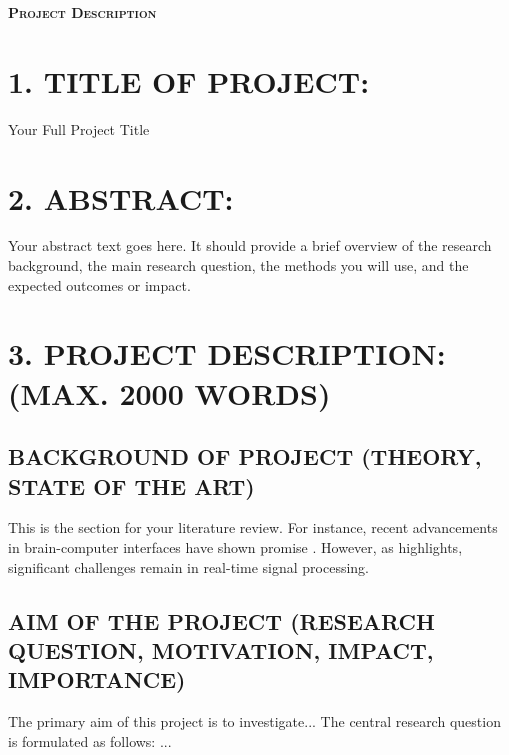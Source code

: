\documentclass[12pt, a4paper]{article}
\begin{document}
\begin{center}
    \fontsize{14}{18}\bfseries
    \textsc{Project Description}
    \vspace{2em}
\end{center}


\section*{1. TITLE OF PROJECT:}
Your Full Project Title

\section*{2. ABSTRACT:}
\justifying
Your abstract text goes here. It should provide a brief overview of the research background, the main research question, the methods you will use, and the expected outcomes or impact.

\section*{3. PROJECT DESCRIPTION: (MAX. 2000 WORDS)}

\subsection*{BACKGROUND OF PROJECT (THEORY, STATE OF THE ART)}
\justifying
This is the section for your literature review. For instance, recent advancements in brain-computer interfaces have shown promise \parencite{Author2023}. However, as \textcite{Researcher2022} highlights, significant challenges remain in real-time signal processing.

\subsection*{AIM OF THE PROJECT (RESEARCH QUESTION, MOTIVATION, IMPACT, IMPORTANCE)}
\justifying
The primary aim of this project is to investigate... The central research question is formulated as follows: ...
\end{document}
